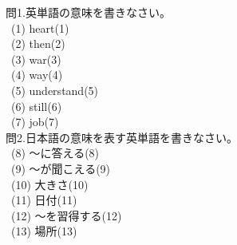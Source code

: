 \documentclass[uplatex]{jsarticle}
\title{\vspace{-30mm}\flushleft{\huge{第6回\ (\ \ 月\ \ 日)\ Unit14〜15}+$\alpha$}}
\author{\Large{\hspace{90mm}名前\hspace{40mm}得点\hspace{20mm}点}}
\date{\empty}
\begin{document}
\maketitle
\vspace{-10mm}
\Large 問1.英単語の意味を書きなさい。\\
\large\ (1) heart\hspace{\fill}(1)\underline{\hspace{35mm}}\\
\ (2) then\hspace{\fill}(2)\underline{\hspace{35mm}}\\
\ (3) war\hspace{\fill}(3)\underline{\hspace{35mm}}\\
\ (4) way\hspace{\fill}(4)\underline{\hspace{35mm}}\\
\ (5) understand\hspace{\fill}(5)\underline{\hspace{35mm}}\\
\ (6) still\hspace{\fill}(6)\underline{\hspace{35mm}}\\
\ (7) job\hspace{\fill}(7)\underline{\hspace{35mm}}\\
\Large 問2.日本語の意味を表す英単語を書きなさい。\\
\large\ (8) 〜に答える\hspace{\fill}(8)\underline{\hspace{35mm}}\\
\ (9) 〜が聞こえる\hspace{\fill}(9)\underline{\hspace{35mm}}\\
\ (10) 大きさ\hspace{\fill}(10)\underline{\hspace{35mm}}\\
\ (11) 日付\hspace{\fill}(11)\underline{\hspace{35mm}}\\
\ (12) 〜を習得する\hspace{\fill}(12)\underline{\hspace{35mm}}\\
\ (13) 場所\hspace{\fill}(13)\underline{\hspace{35mm}}\\
\end{document}
